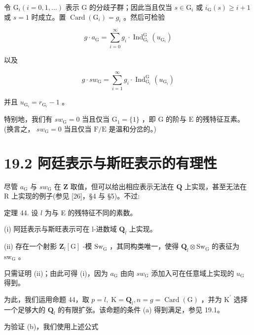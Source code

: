 \documentclass[10pt]{article}
\begin{document}
令 \({\mathrm{G}}_{i}\left( {i = 0,1,\ldots }\right)\) 表示 \(\mathrm{G}\) 的分歧子群；因此当且仅当 \(s \in  {\mathrm{G}}_{i}\) 或 \({i}_{\mathrm{G}}\left( s\right)  \geq  i + 1\) 或 \(s = 1\) 时成立。置 \(\operatorname{Card}\left( {\mathrm{G}}_{i}\right)  = {g}_{i}\) 。然后可检验

\[
g \cdot  {a}_{\mathrm{G}} = \mathop{\sum }\limits_{{i = 0}}^{\infty }{g}_{i} \cdot  {\operatorname{Ind}}_{{\mathrm{G}}_{i}}^{\mathrm{G}}\left( {u}_{{\mathrm{G}}_{i}}\right)
\]

以及

\[
g \cdot  s{w}_{\mathrm{G}} = \mathop{\sum }\limits_{{i = 1}}^{\infty }{g}_{i} \cdot  {\operatorname{Ind}}_{{\mathrm{G}}_{i}}^{\mathrm{G}}\left( {u}_{{\mathrm{G}}_{i}}\right)
\]

并且 \({u}_{{\mathrm{G}}_{i}} = {r}_{{\mathrm{G}}_{i}} - 1\) 。

特别地，我们有 \(s{w}_{\mathrm{G}} = 0\) 当且仅当 \({\mathrm{G}}_{1} = \{ 1\}\) ，即 \(\mathrm{G}\) 的阶与 \(\mathrm{E}\) 的残特征互素。(换言之， \(s{w}_{\mathrm{G}} = 0\) 当且仅当 \(\mathrm{F}/\mathrm{E}\) 是温和分岔的。)

\section*{19.2 阿廷表示与斯旺表示的有理性}

尽管 \({a}_{\mathrm{G}}\) 与 \(s{w}_{\mathrm{G}}\) 在 \(\mathbf{Z}\) 取值，但可以给出相应表示无法在 \(\mathbf{Q}\) 上实现，甚至无法在 R 上实现的例子(参见 [26]，§4 与 §5)。不过:

定理 44. 设 \(l\) 为与 E 的残特征不同的素数。

(i) 阿廷表示与斯旺表示可在 l-进数域 \({\mathbf{Q}}_{l}\) 上实现。

(ii) 存在一个射影 \({\mathbf{Z}}_{l}\left\lbrack  \mathrm{G}\right\rbrack\) -模 \({\mathrm{{Sw}}}_{\mathrm{G}}\) ，其同构类唯一，使得 \({\mathbf{Q}}_{l} \otimes  {\mathrm{{Sw}}}_{\mathrm{G}}\) 的表征为 \({\mathrm{{sw}}}_{\mathrm{G}}\) 。

只需证明 (ii)；由此可得 (i)，因为 \({a}_{\mathrm{G}}\) 由向 \(s{w}_{\mathrm{G}}\) 添加入可在任意域上实现的 \({u}_{\mathrm{G}}\) 得到。

为此，我们运用命题 44，取 \(p = l,\mathrm{\;K} = {\mathbf{Q}}_{l},n = g = \operatorname{Card}\left( \mathrm{G}\right)\) ，并为 \({\mathrm{K}}^{\prime }\) 选择一个足够大的 \({\mathbf{Q}}_{l}\) 的有限扩张。该命题的条件 (a) 得到满足，参见 19.1。

为验证 (b)，我们使用上述公式
\end{document}
